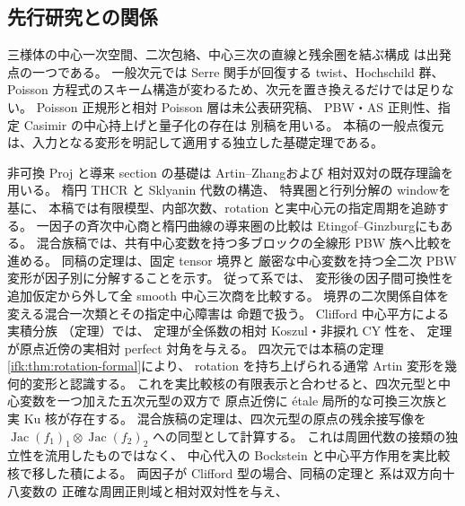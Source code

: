 \subsection{先行研究との関係}

三様体の中心一次空間、二次包絡、中心三次の直線と残余圏を結ぶ構成
\cite{Threefold}は出発点の一つである。
一般次元では Serre 関手が回復する twist、Hochschild 群、
Poisson 方程式のスキーム構造が変わるため、次元を置き換えるだけでは足りない。
Poisson 正規形と相対 Poisson 層は未公表研究稿\cite{NCCubicA}、
PBW・AS 正則性、指定 Casimir の中心持上げと量子化の存在は
別稿\cite{CubicQuantization}を用いる。
本稿の一般点復元は、入力となる変形を明記して適用する独立した基礎定理である。

非可換 Proj と導来 section の基礎は Artin--Zhang\cite{LP-AZ}および
相対双対の既存理論\cite{LP-BS}を用いる。
楕円 THCR と Sklyanin 代数の構造\cite{GRSklyaninATV,GRSklyaninST}、
特異圏と行列分解の window\cite{NFMOrlovSingularities}を基に、
本稿では有限模型、内部次数、rotation と実中心元の指定周期を追跡する。
一因子の斉次中心商と楕円曲線の導来圏の比較は
Etingof--Ginzburg\cite[Section~3.5, Theorem~3.6.2(i)]{NFMEG}にもある。
混合族稿では、共有中心変数を持つ多ブロックの全線形 PBW 族へ比較を進める。
同稿の定理は、固定 tensor 境界と
厳密な中心変数を持つ全二次 PBW 変形が因子別に分解することを示す。
従って系では、
変形後の因子間可換性を追加仮定から外して全 smooth 中心三次商を比較する。
境界の二次関係自体を変える混合一次類とその指定中心障害は
命題で扱う。
Clifford 中心平方による実積分族
（定理）では、
定理が全係数の相対 Koszul・非捩れ CY 性を、
定理が原点近傍の実相対 perfect 対角を与える。
四次元では本稿の定理\ref{ifk:thm:rotation-formal}により、
rotation を持ち上げられる通常 Artin 変形を幾何的変形と認識する。
これを実比較核の有限表示と合わせると、四次元型と中心変数を一つ加えた五次元型の双方で
原点近傍に \'etale 局所的な可換三次族と実 Ku 核が存在する。
混合族稿の定理は、四次元型の原点の残余接写像を
$\operatorname{Jac}(f_1)_1\otimes\operatorname{Jac}(f_2)_2$ への同型として計算する。
これは周囲代数の接類の独立性を流用したものではなく、
中心代入の Bockstein と中心平方作用を実比較核で移した積による。
両因子が Clifford 型の場合、同稿の定理と
系は双方向十八変数の
正確な周囲正則域と相対双対性を与え、
